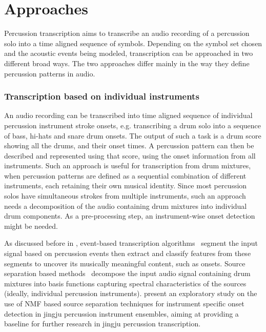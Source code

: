 \section{Approaches} %
Percussion transcription aims to transcribe an audio recording of a percussion solo into a time aligned sequence of symbols. Depending on the symbol set chosen and the acoustic events being modeled, transcription can be approached in two different broad ways. The two approaches differ mainly in the way they define percussion patterns in audio. %
\subsubsection{Transcription based on individual instruments}
An audio recording can be transcribed into time aligned sequence of individual percussion instrument stroke onsets, e.g. transcribing a drum solo into a sequence of bass, hi-hats and snare drum onsets. The output of such a task is a drum score showing all the drums, and their onset times. A percussion pattern can then be described and represented using that score, using the onset information from all instruments. Such an approach is useful for transcription from drum mixtures, when percussion patterns are defined as a sequential combination of different instruments, each retaining their own musical identity. Since most percussion solos have simultaneous strokes from multiple instruments, such an approach needs a decomposition of the audio containing drum mixtures into individual drum components. As a pre-processing step, an instrument-wise onset detection might be needed. 

As discussed before in , event-based transcription algorithms~\cite{gillet:04:drumloops,gouyon:02:pulse,goto:94:soundSep,gillet:08:transcription} segment the input signal based on percussion events then extract and classify features from these segments to uncover its musically meaningful content, such as onsets. Source separation based methods~\cite{paulus:05:drum,smaragdis:04:convNMF,abdallah:03:probability} decompose the input audio signal containing drum mixtures into basis functions capturing spectral characteristics of the sources (ideally, individual percussion instruments).  present an exploratory study on the use of \gls{NMF} based source separation techniques for instrument specific onset detection in \gls{jingju} percussion instrument ensembles, aiming at providing a baseline for further research in \gls{jingju} percussion transcription. 
%
